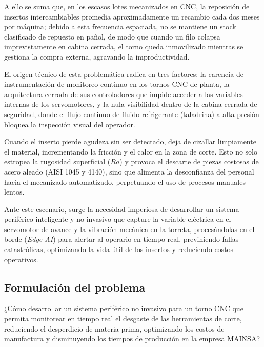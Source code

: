 A ello se suma que, en los escasos lotes mecanizados en CNC, la reposición de insertos intercambiables promedia aproximadamente un recambio cada dos meses por máquina; debido a esta frecuencia espaciada, no se mantiene un stock clasificado de repuesto en pañol, de modo que cuando un filo colapsa imprevistamente en cabina cerrada, el torno queda inmovilizado mientras se gestiona la compra externa, agravando la improductividad.

El origen técnico de esta problemática radica en tres factores: la carencia de instrumentación de monitoreo continuo en los tornos CNC de planta, la arquitectura cerrada de sus controladores que impide acceder a las variables internas de los servomotores, y la nula visibilidad dentro de la cabina cerrada de seguridad, donde el flujo continuo de fluido refrigerante (taladrina) a alta presión bloquea la inspección visual del operador.

Cuando el inserto pierde agudeza sin ser detectado, deja de cizallar limpiamente el material, incrementando la fricción y el calor en la zona de corte. Esto no solo estropea la rugosidad superficial ($Ra$) y provoca el descarte de piezas costosas de acero aleado (AISI 1045 y 4140), sino que alimenta la desconfianza del personal hacia el mecanizado automatizado, perpetuando el uso de procesos manuales lentos.

Ante este escenario, surge la necesidad imperiosa de desarrollar un sistema periférico inteligente y no invasivo que capture la variable eléctrica en el servomotor de avance y la vibración mecánica en la torreta, procesándolas en el borde (\textit{Edge AI}) para alertar al operario en tiempo real, previniendo fallas catastróficas, optimizando la vida útil de los insertos y reduciendo costos operativos.

\newpage
\subsection{Formulación del problema}

¿Cómo desarrollar un sistema periférico no invasivo para un torno CNC que permita monitorear en tiempo real el desgaste de las herramientas de corte, reduciendo el desperdicio de materia prima, optimizando los costos de manufactura y disminuyendo los tiempos de producción en la empresa MAINSA?

